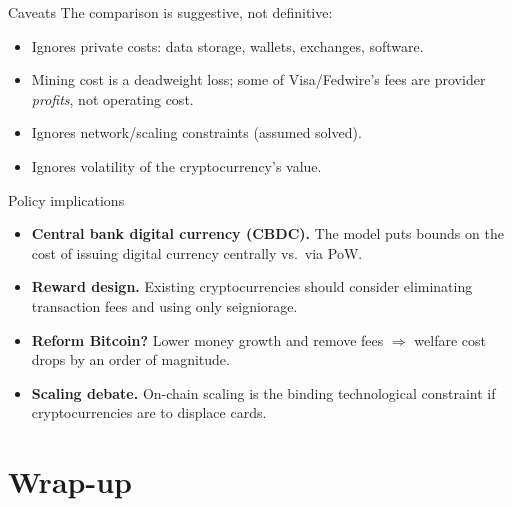 \documentclass[aspectratio=169,xcolor=dvipsnames]{beamer}
\begin{document}
\begin{frame}{Caveats}
    The comparison is suggestive, not definitive:
    \vspace{2mm}
    \begin{itemize}
        \item Ignores private costs: data storage, wallets, exchanges, software.
        \item Mining cost is a deadweight loss; some of Visa/Fedwire's fees are
              provider \emph{profits}, not operating cost.
        \item Ignores network/scaling constraints (assumed solved).
        \item Ignores volatility of the cryptocurrency's value.
    \end{itemize}
\end{frame}

\begin{frame}{Policy implications}
    \begin{itemize}
        \item \textbf{Central bank digital currency (CBDC).} The model puts bounds on
              the cost of issuing digital currency centrally vs.\ via PoW.
        \item \textbf{Reward design.} Existing cryptocurrencies should consider eliminating
              transaction fees and using only seigniorage.
        \item \textbf{Reform Bitcoin?} Lower money growth and remove fees $\Rightarrow$ welfare cost
              drops by an order of magnitude.
        \item \textbf{Scaling debate.} On-chain scaling is the binding technological constraint
              if cryptocurrencies are to displace cards.
    \end{itemize}
\end{frame}

\section{Wrap-up}
\end{document}
